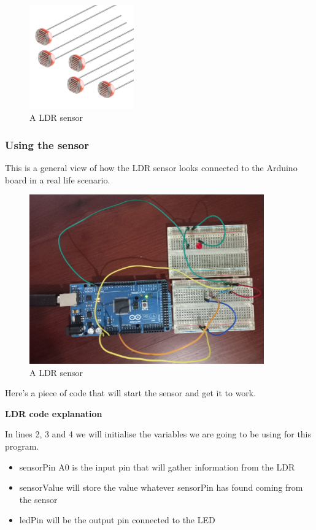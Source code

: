 \begin{figure}[H]
    \centering
    \includegraphics[width=0.4\textwidth]{fig/ldr.jpg}
    \caption{A LDR sensor}
    \label{fig:ldr}
\end{figure}

\subsubsection{Using the sensor}

This is a general view of how the LDR sensor looks connected to the Arduino board in a real life scenario.

\begin{figure}[H]
    \centering
    \includegraphics[width=0.9\textwidth]{fig/ldr-circuit.jpg}
    \caption{A LDR sensor}
    \label{fig:ldr}
\end{figure}

Here's a piece of code that will start the sensor and get it to work.


\textbf{LDR code explanation}

In lines 2, 3 and 4 we will initialise the variables we are going to be using for this program.
\begin{itemize}
	\item sensorPin A0 is the input pin that will gather information from the LDR
	\item sensorValue will store the value whatever sensorPin has found coming from the sensor
	\item ledPin will be the output pin connected to the LED
\end{itemize}

